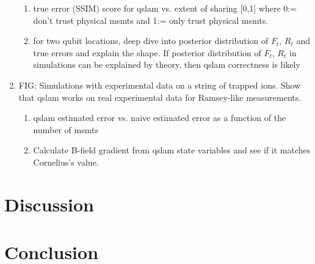 \begin{enumerate}
\begin{enumerate}
		\item true error (SSIM) score for qslam vs. extent of sharing [0,1] where 0:= don't trust physical msmts and 1:= only trust physical msmts.
		\item for two qubit locations, deep dive into posterior distribution of $F_t$, $R_t$ and true errors and explain the shape. If posterior distribution of $F_t$, $R_t$ in simulations can be explained by theory, then qslam correctness is likely
	\end{enumerate}
	\item FIG: Simulations with experimental data on a string of trapped ions. Show that qslam works on real experimental data for Ramsey-like measurements.  
	\begin{enumerate}
		\item  qslam estimated error vs. naive estimated error as a function of the number of msmts
		\item Calculate B-field gradient from qslam state variables and see if it matches Cornelius's value.
	\end{enumerate}
\end{enumerate}

\section{Discussion}
\section{Conclusion}
